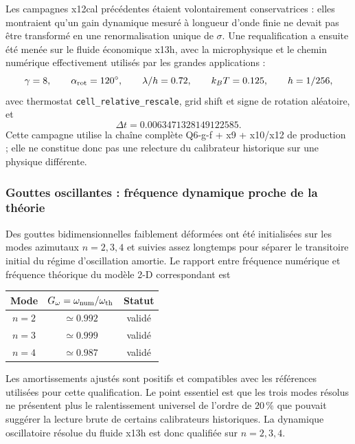 \documentclass[11pt,a4paper]{article}
\begin{document}
Les campagnes x12cal précédentes étaient volontairement conservatrices : elles montraient qu'un gain dynamique mesuré à longueur d'onde finie ne devait pas être transformé en une renormalisation unique de $\sigma$. Une requalification a ensuite été menée sur le fluide économique x13h, avec la microphysique et le chemin numérique effectivement utilisés par les grandes applications :
\begin{equation}
  \gamma=8,\qquad
  \alpha_{\rm rot}=120^\circ,\qquad
  \lambda/h=0.72,\qquad
  k_BT=0.125,\qquad
  h=1/256,
\end{equation}
avec thermostat \texttt{cell\_relative\_rescale}, grid shift et signe de rotation aléatoire, et
\begin{equation}
  \Delta t=0.0063471328149122585.
\end{equation}
Cette campagne utilise la chaîne complète Q6-g-f + x9 + x10/x12 de production ; elle ne constitue donc pas une relecture du calibrateur historique sur une physique différente.

\subsubsection{Gouttes oscillantes : fréquence dynamique proche de la théorie}

Des gouttes bidimensionnelles faiblement déformées ont été initialisées sur les modes azimutaux $n=2,3,4$ et suivies assez longtemps pour séparer le transitoire initial du régime d'oscillation amortie. Le rapport entre fréquence numérique et fréquence théorique du modèle 2-D correspondant est
\begin{center}
\begin{tabular}{ccc}
\toprule
Mode & $G_\omega=\omega_{\rm num}/\omega_{\rm th}$ & Statut \\
\midrule
$n=2$ & $\simeq0.992$ & validé \\
$n=3$ & $\simeq0.999$ & validé \\
$n=4$ & $\simeq0.987$ & validé \\
\bottomrule
\end{tabular}
\end{center}
Les amortissements ajustés sont positifs et compatibles avec les références utilisées pour cette qualification. Le point essentiel est que les trois modes résolus ne présentent plus le ralentissement universel de l'ordre de $20\,\%$ que pouvait suggérer la lecture brute de certains calibrateurs historiques. La dynamique oscillatoire résolue du fluide x13h est donc qualifiée sur $n=2,3,4$.
\end{document}
